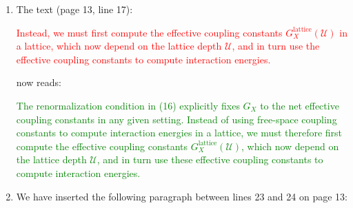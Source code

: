 \documentclass[preprint]{revtex4-1}
\renewcommand{\t}{\text} %
\newcommand{\p}[1]{\left(#1\right)} %
\renewcommand{\O}{\mathcal{O}}
\newcommand{\U}{\mathcal{U}}
\newcommand{\1}{\mathds{1}}
\newcommand{\shrink}[1]{\scalebox{0.8}{#1}} %
\newcommand{\red}[1]{\textcolor{red}{#1}}
\newcommand{\green}[1]{\textcolor{green}{#1}}
\newcounter{point}
\begin{document}
\begin{enumerate}[label=(R1.\arabic{point}.\arabic*)]
{\begin{align*}
{{\begin{tikzpicture}
\begin{feynman}
              \vertex[below right = of v2] (f4);
              \diagram* {
                (f1) -- (v1),
                (f2) -- (v1),
                (v2) -- (f3),
                (v2) -- (f4),
                (v1) --[scalar, half left] (v2),
                (v1) --[scalar, half right] (v2) };
            \end{feynman}
          \end{tikzpicture}}
        \\ \O(G^2)}
      + \cdots = \substack{
        \shrink{
          \begin{tikzpicture}
            \begin{feynman}
              \vertex (v);
              \vertex[above left = of v] (f1);
              \vertex[below left = of v] (f2);
              \vertex[above right = of v] (f3);
              \vertex[below right = of v] (f4);
              \diagram* {
                (f1) -- (v),
                (f2) -- (v),
                (v) -- (f3),
                (v) -- (f4) };
            \end{feynman}
          \end{tikzpicture}}
        \\ \O(G)}.
      \tag{16}
    \end{align*}
    This renormalization condition has the benefit of allowing us to
    express effective two-body interactions simply in terms of net
    effective two-body coupling constants, rather than in terms of
    long sums at all order of the bare coupling constants.}


\item The text (page 13, line 17):

  \red{Instead, we must first compute the effective coupling constants
    $G_X^{\t{lattice}}\p{\U}$ in a lattice, which now depend on the
    lattice depth $\U$, and in turn use the effective coupling
    constants to compute interaction energies.}

  now reads:

  \green{The renormalization condition in (16) explicitly fixes $G_X$
    to the net effective coupling constants in any given setting.
    Instead of using free-space coupling constants to compute
    interaction energies in a lattice, we must therefore first compute
    the effective coupling constants $G_X^{\t{lattice}}\p{\U}$, which
    now depend on the lattice depth $\U$, and in turn use these
    effective coupling constants to compute interaction energies.}


\item We have inserted the following paragraph between lines 23 and 24
  on page 13:


\end{enumerate}
\end{document}
